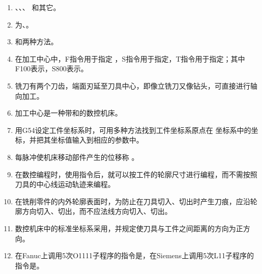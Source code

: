 \documentclass{HUNNUexam}
\author{李老师}%
\begin{document}
\begin{enumerate} [1.]
	\item {}、、、 和其它。%

	\item {}为、。%

	\item {}和两种方法。

	\item 在加工中心中，F指令用于指定 ，S指令用于指定，T指令用于指定；其中F100表示，S800表示。

	\item {}铣刀有两个刀齿，端面刃延至刀具中心，即像立铣刀又像钻头，可直接进行轴向加工。

	\item 加工中心是一种带和的数控机床。

	\item 用G54设定工件坐标系时，可用多种方法找到工件坐标系原点在 坐标系中的坐标，并把其坐标值输入到相应的参数中。

	\item 每脉冲使机床移动部件产生的位移称  。

	\item 在数控编程时，使用指令后，就可以按工件的轮廓尺寸进行编程，而不需按照刀具的中心线运动轨迹来编程。

	\item 在铣削零件的内外轮廓表面时，为防止在刀具切入、切出时产生刀痕，应沿轮廓方向切入、切出，而不应法线方向切入、切出。

	\item 数控机床中的标准坐标系采用，并规定使刀具与工件之间距离的方向为正方向。

	\item 在Fanuc上调用5次O1111子程序的指令是，在Siemens上调用5次L11子程序的指令是。


\end{enumerate}
\end{document}
